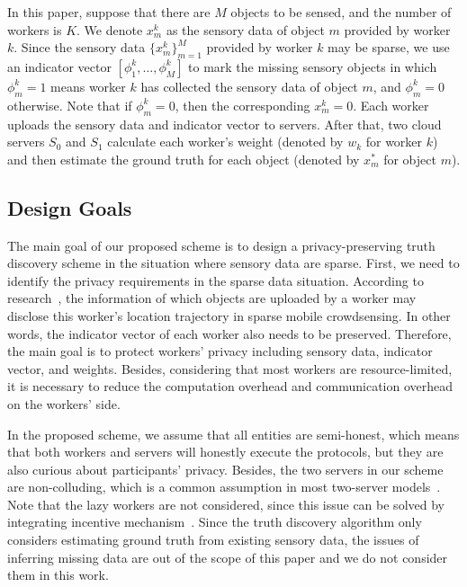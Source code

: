 \documentclass[conference]{IEEEtran}
\begin{document}
In this paper, suppose that there are $M$ objects to be sensed, and the number of workers is $K$.
We denote $x_m^k$ as the sensory data of object $m$ provided by worker $k$.
Since the sensory data $\{x_m^k\}_{m=1}^M$ provided by worker $k$ may be sparse, we use an indicator vector $[\phi_1^k, \ldots, \phi_M^k]$ to mark the missing sensory objects in which $\phi_m^k = 1$ means worker $k$ has collected the sensory data of object $m$, and $\phi_m^k = 0$ otherwise.
Note that if $\phi_m^k = 0$, then the corresponding $x_m^k = 0$.
Each worker uploads the sensory data and indicator vector to servers.
After that, two cloud servers $S_0$ and $S_1$ calculate each worker's weight (denoted by $w_k$ for worker $k$) and then estimate the ground truth for each object (denoted by $x_m^*$ for object $m$). 
\subsection{Design Goals}

The main goal of our proposed scheme is to design a privacy-preserving truth discovery scheme in the situation where sensory data are sparse.
First, we need to identify the privacy requirements in the sparse data situation.
According to research~\cite{wang_sparse_2020}, the information of which objects are uploaded by a worker may disclose this worker's location trajectory in sparse mobile crowdsensing.
In other words, the indicator vector of each worker also needs to be preserved.
Therefore, the main goal is to protect workers' privacy including sensory data, indicator vector, and weights.
Besides, considering that most workers are resource-limited, it is necessary to reduce the computation overhead and communication overhead on the workers' side.

In the proposed scheme, we assume that all entities are semi-honest, which means that both workers and servers will honestly execute the protocols, but they are also curious about participants' privacy.
Besides, the two servers in our scheme are non-colluding, which is a common assumption in most two-server models~\cite{zhang_lptd_2019,zhang_reliable_2019}.
Note that the lazy workers are not considered, since this issue can be solved by integrating incentive mechanism~\cite{xue_inpptd_2020}.
Since the truth discovery algorithm only considers estimating ground truth from existing sensory data, the issues of inferring missing data are out of the scope of this paper and we do not consider them in this work.
\end{document}
